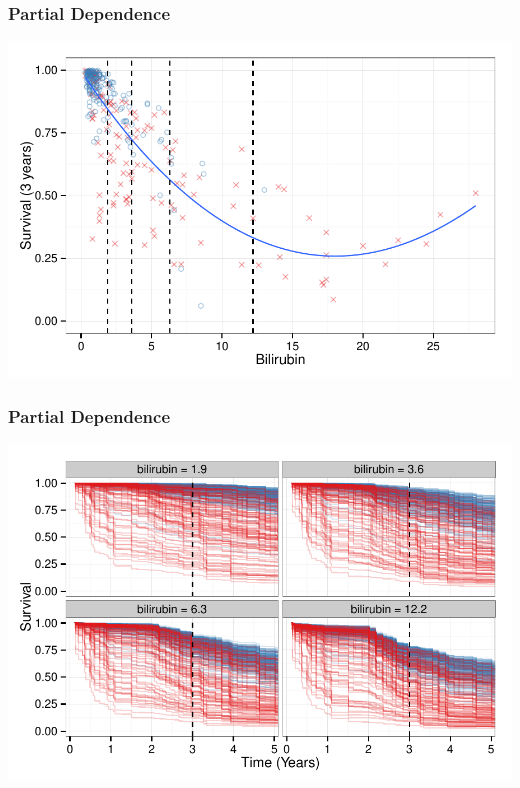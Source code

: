 \documentclass[xcolor=svgnames]{beamer}\usepackage[]{graphicx}\usepackage[]{color}
\newenvironment{knitrout}{}{} %
\begin{document}
\begin{frame}
\frametitle{Partial Dependence}

\begin{knitrout}\footnotesize
{}\color{fgcolor}

{\centering \includegraphics[width=.9\linewidth]{figures/rfs-points-1} 

}



\end{knitrout}
\end{frame}
\begin{frame}
\frametitle{Partial Dependence}

\begin{knitrout}\footnotesize
{}\color{fgcolor}

{\centering \includegraphics[width=.9\linewidth]{figures/rfs-nomo-1} 

}



\end{knitrout}
\end{frame}
\end{document}
